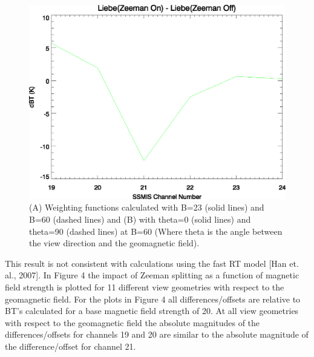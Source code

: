 \begin{figure}[htp]
  \centering{}
  \includegraphics[scale=0.8]{./graphics/Liebe_Comparison.eps}
  \caption{(A) Weighting functions calculated with B=23\microtesla{} (solid lines) and B=60\microtesla{} (dashed lines) and (B) with theta=0 (solid lines) and theta=90 (dashed lines)
  at B=60\microtesla{} (Where theta is the angle between the view direction and the geomagnetic field).}
\end{figure}
 
This result is not consistent with calculations using the fast RT model [Han et. al., 2007].
In Figure 4 the impact of Zeeman splitting as a function of magnetic field strength is plotted for 11 different view geometries with respect to the geomagnetic
field. For the plots in Figure 4 all differences/offsets are relative to BT's calculated for a base magnetic field strength of 20\microtesla{}. At all view
geometries with respect to the geomagnetic field the absolute magnitudes of the differences/offsets for channels 19 and 20 are similar to the absolute
magnitude of the difference/offset for channel 21.   

\newpage

